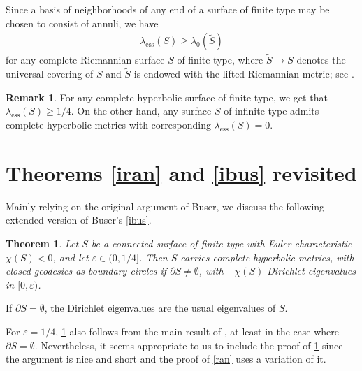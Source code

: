 \documentclass[a4paper,11pt]{amsart}
\numberwithin{equation}{section}
\newtheorem{thm}[equation]{Theorem}
\theoremstyle{definition}
\newtheorem{rem}[equation]{Remark}
\def\ve{\varepsilon}
\DeclareMathOperator{\ess}{ess}
\begin{document}
Since a basis of neighborhoods of any end of a surface of finite type may be chosen to consist of annuli, we have
\begin{align}\label{ess0}
  \lambda_{\ess}(S)\ge\lambda_0(\tilde S)
\end{align}
for any complete Riemannian surface $S$ of finite type,
where $\tilde S\to S$ denotes the universal covering of $S$ and $\tilde S$ is endowed with the lifted Riemannian metric; see \cite[Proposition 3.9]{BMM2}.

\begin{rem}
For any complete hyperbolic surface of finite type, we get that $\lambda_{\ess}(S)\ge1/4$.
On the other hand, any surface $S$ of infinite type admits complete hyperbolic metrics with corresponding $\lambda_{\ess}(S)=0$.
\end{rem}

\section{Theorems \ref{iran} and \ref{ibus} revisited}
\label{secbr}
Mainly relying on the original argument of Buser, we discuss the following extended version of Buser's \cref{ibus}.

\begin{thm}\label{bus}
Let $S$ be a connected surface of finite type with Euler characteristic $\chi(S)<0$, and let $\ve\in(0,1/4]$.
Then $S$ carries complete hyperbolic metrics, with closed geodesics as boundary circles if $\partial S\ne\emptyset$, with $-\chi(S)$ Dirichlet eigenvalues in $[0,\ve)$.
\end{thm}

If $\partial S=\emptyset$, the Dirichlet eigenvalues are the usual eigenvalues of $S$.

For $\ve=1/4$, \cref{bus} also follows from the main result of \cite{DPRS}, at least in the case where $\partial S=\emptyset$.
Nevertheless, it seems appropriate to us to include the proof of \cref{bus}
since the argument is nice and short and the proof of \cref{ran} uses a variation of it.
\end{document}
